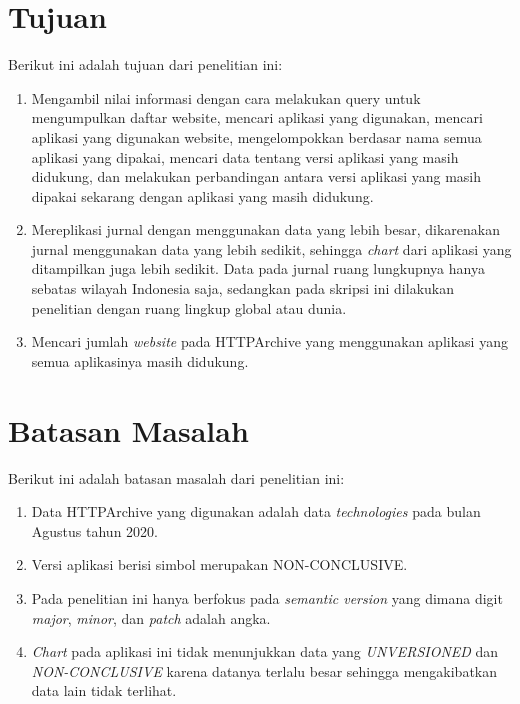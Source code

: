 \section{Tujuan}
\label{sec:tujuan}
Berikut ini adalah tujuan dari penelitian ini:
\begin{enumerate}
	\item Mengambil nilai informasi dengan cara melakukan query untuk mengumpulkan daftar website, mencari aplikasi yang digunakan, mencari aplikasi yang digunakan website, mengelompokkan berdasar nama semua aplikasi yang dipakai, mencari data tentang versi aplikasi yang masih didukung, dan melakukan perbandingan antara versi aplikasi yang masih dipakai sekarang dengan aplikasi yang masih didukung.
	\item Mereplikasi jurnal \cite{pascal} dengan menggunakan data yang lebih besar, dikarenakan jurnal \cite{pascal} menggunakan data yang lebih sedikit, sehingga \textit{chart} dari aplikasi yang ditampilkan juga lebih sedikit. Data pada jurnal \cite{pascal} ruang lungkupnya hanya sebatas wilayah Indonesia saja, sedangkan pada skripsi ini dilakukan penelitian dengan ruang lingkup global atau dunia. 
	\item Mencari jumlah \textit{website} pada HTTPArchive yang menggunakan aplikasi yang semua aplikasinya masih didukung.
\end{enumerate}


\section{Batasan Masalah}
\label{sec:batasan}
Berikut ini adalah batasan masalah dari penelitian ini:
\begin{enumerate}
    \item Data HTTPArchive yang digunakan adalah data \textit{technologies} pada bulan Agustus tahun 2020.
    \item Versi aplikasi berisi simbol merupakan NON-CONCLUSIVE.
    \item Pada penelitian ini hanya berfokus pada \textit{semantic version} yang dimana digit \textit{major}, \textit{minor}, dan \textit{patch} adalah angka.
    \item \textit{Chart} pada aplikasi ini tidak menunjukkan data yang \textit{UNVERSIONED} dan \textit{NON-CONCLUSIVE} karena datanya terlalu besar sehingga mengakibatkan data lain tidak terlihat.
\end{enumerate}

